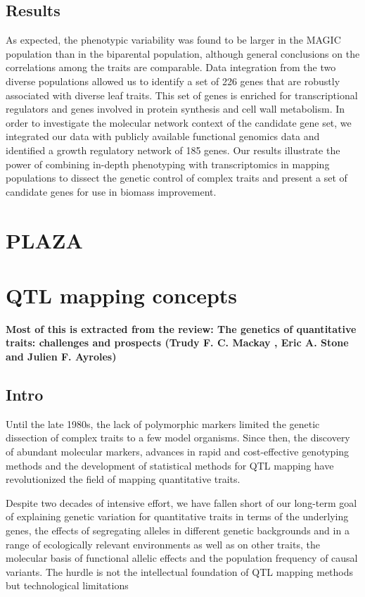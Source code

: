 \documentclass[a4paper,10pt]{article}
\begin{document}
\subsection{Results}
As expected, the phenotypic variability was found to be larger in the MAGIC population than in the biparental population, although general conclusions on the correlations among the traits are comparable.
Data integration from the two diverse populations allowed us to identify a set of 226 genes that are robustly associated with diverse leaf traits.
This set of genes is enriched for transcriptional regulators and genes involved in protein synthesis and cell wall metabolism. In order to investigate the molecular network context of the candidate gene set, we integrated our data with publicly available
functional genomics data and identified a growth regulatory network of 185 genes. Our results illustrate the power of combining in-depth phenotyping with transcriptomics in mapping populations to dissect the genetic control of complex traits
and present a set of candidate genes for use in biomass improvement.




\section{PLAZA}




\section{QTL mapping concepts}   

\textbf{Most of this is extracted from the review: The genetics of quantitative traits: challenges and prospects (Trudy F. C. Mackay , Eric A. Stone  and Julien F. Ayroles)}

\subsection{Intro}
Until the late 1980s, the lack of polymorphic markers limited the genetic dissection of complex traits to a few model organisms. 
Since then, the discovery of abundant molecular markers, advances in rapid and cost-effective genotyping methods and the development of statistical methods for QTL mapping have revolutionized the field of mapping quantitative traits.

Despite two decades of intensive effort, we have fallen short of our long-term goal of explaining genetic variation for quantitative traits in terms of the underlying genes, the effects of segregating alleles in different genetic backgrounds and in a range of ecologically relevant
environments as well as on other traits, the molecular basis of functional allelic effects and the population frequency of causal variants.
The hurdle is not the intellectual foundation of QTL mapping methods but technological limitations
\end{document}
